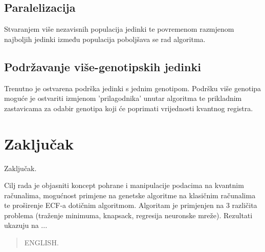 \documentclass[times, utf8, zavrsni]{fer}
\begin{document}
\section{Paralelizacija}
Stvaranjem više nezavisnih populacija jedinki te povremenom razmjenom najboljih jedinki između populacija poboljšava se rad algoritma.

\section{Podržavanje više-genotipskih jedinki}
Trenutno je ostvarena podrška jedinki s jednim genotipom. Podršku više genotipa moguće je ostvariti izmjenom 'prilagodnika' unutar algoritma te prikladnim zastavicama za odabir genotipa koji će poprimati vrijednosti kvantnog registra.

\chapter{Zaključak}
Zaključak.




\begin{sazetak}
Cilj rada je objasniti koncept pohrane i manipulacije podacima na kvantnim računalima, mogućnost primjene na genetske algoritme na klasičnim računalima te proširenje ECF-a dotičnim algoritmom. Algoritam je primjenjen na 3 različita problema (traženje minimuma, knapsack, regresija neuronske mreže). Rezultati ukazuju na ...

\end{sazetak}

\begin{abstract}
ENGLISH.

\end{abstract}
\end{document}
